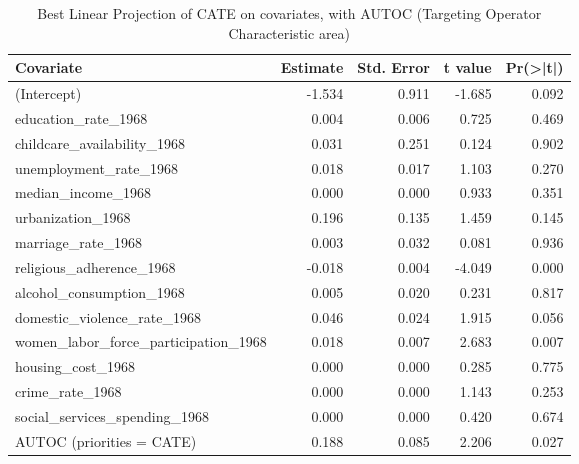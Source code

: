 \begin{table}[!htbp]\centering
\caption{Best Linear Projection of CATE on covariates, with AUTOC (Targeting Operator Characteristic area)}
\label{tab:ex2b_blp_toc}
\begin{tabular}{lrrrr}
\toprule
Covariate & Estimate & Std. Error & t value & Pr(>|t|) \\
\midrule
(Intercept) & -1.534 & 0.911 & -1.685 & 0.092 \\
education\_rate\_1968 & 0.004 & 0.006 & 0.725 & 0.469 \\
childcare\_availability\_1968 & 0.031 & 0.251 & 0.124 & 0.902 \\
unemployment\_rate\_1968 & 0.018 & 0.017 & 1.103 & 0.270 \\
median\_income\_1968 & 0.000 & 0.000 & 0.933 & 0.351 \\
urbanization\_1968 & 0.196 & 0.135 & 1.459 & 0.145 \\
marriage\_rate\_1968 & 0.003 & 0.032 & 0.081 & 0.936 \\
religious\_adherence\_1968 & -0.018 & 0.004 & -4.049 & 0.000 \\
alcohol\_consumption\_1968 & 0.005 & 0.020 & 0.231 & 0.817 \\
domestic\_violence\_rate\_1968 & 0.046 & 0.024 & 1.915 & 0.056 \\
women\_labor\_force\_participation\_1968 & 0.018 & 0.007 & 2.683 & 0.007 \\
housing\_cost\_1968 & 0.000 & 0.000 & 0.285 & 0.775 \\
crime\_rate\_1968 & 0.000 & 0.000 & 1.143 & 0.253 \\
social\_services\_spending\_1968 & 0.000 & 0.000 & 0.420 & 0.674 \\
AUTOC (priorities = CATE) & 0.188 & 0.085 & 2.206 & 0.027 \\
\bottomrule
\end{tabular}
\end{table}
